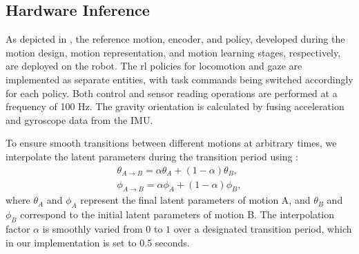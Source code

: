 \subsection{Hardware Inference}
As depicted in , the reference motion, encoder, and policy, developed during the motion design, motion representation, and motion learning stages, respectively, are deployed on the robot.
The \ac{rl} policies for locomotion and gaze are implemented as separate entities, with task commands being switched accordingly for each policy.
Both control and sensor reading operations are performed at a frequency of 100 Hz.
The gravity orientation is calculated by fusing acceleration and gyroscope data from the IMU.

To ensure smooth transitions between different motions at arbitrary times, we interpolate the latent parameters during the transition period using :
\begin{equation}
\begin{split}
    \theta_{A\rightarrow B} = \alpha \theta_A + (1 - \alpha) \theta_B, \\ 
    \phi_{A\rightarrow B} = \alpha \phi_A + (1 - \alpha) \phi_B,
\end{split}
    \label{eqn:natural_transient}
\end{equation}
where $\theta_A$ and $\phi_A$ represent the final latent parameters of motion A, and $\theta_B$ and $\phi_B$ correspond to the initial latent parameters of motion B. The interpolation factor $\alpha$ is smoothly varied from $0$ to $1$ over a designated transition period, which in our implementation is set to 0.5 seconds.